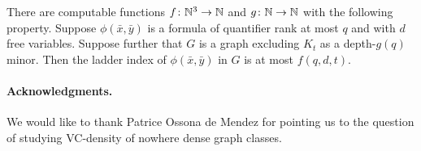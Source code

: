  \begin{theorem}\label{thm:new-stable}
There are computable functions $f\colon \mathbb{N}^3\to\mathbb{N}$ and $g\colon\mathbb{N}\to\mathbb{N}$ with the following property.
Suppose $\phi(\bar x,\bar y)$ is a formula of quantifier rank at most $q$ and with $d$ free variables.
Suppose further that $G$ is a graph excluding $K_t$ as a depth-$g(q)$ minor. Then the ladder index of $\phi(\bar x,\bar y)$ in $G$ is at most $f(q,d,t)$.
 \end{theorem}




\paragraph{Acknowledgments.} We would like to
thank Patrice Ossona de Mendez for pointing us to the
question of studying VC-density of nowhere dense graph
classes.
